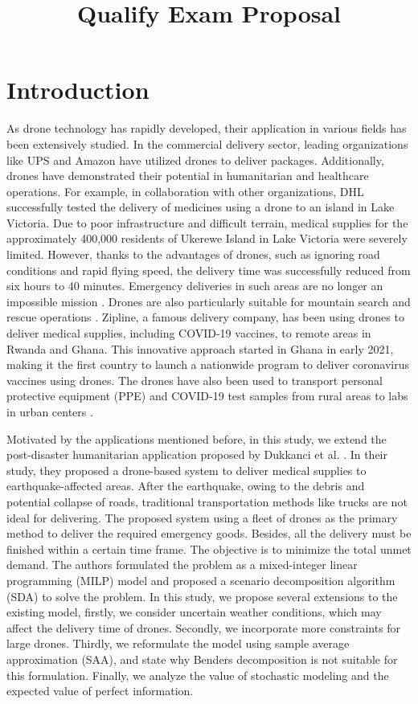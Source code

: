 \documentclass{lxaiproposal}
\title{Qualify Exam Proposal}
\author{\coord{Yuyang}{Ma}{}}
\begin{document}
\maketitle
\section{Introduction} \label{section:intro}
\vspace*{-3mm}

As drone technology has rapidly developed, their application in various fields has been extensively studied. In the commercial delivery sector, leading organizations like UPS \cite{ups2017drone} and Amazon \cite{amazon2022drone} have utilized drones to deliver packages. Additionally, drones have demonstrated their potential in humanitarian and healthcare operations. For example, in collaboration with other organizations, DHL successfully tested the delivery of medicines using a drone to an island in Lake Victoria. Due to poor infrastructure and difficult terrain, medical supplies for the approximately 400,000 residents of Ukerewe Island in Lake Victoria were severely limited. However, thanks to the advantages of drones, such as ignoring road conditions and rapid flying speed, the delivery time was successfully reduced from six hours to 40 minutes. Emergency deliveries in such areas are no longer an impossible mission \cite{dhl2018drone}. Drones are also particularly suitable for mountain search and rescue operations \cite{karaca2018potential}. Zipline, a famous delivery company, has been using drones to deliver medical supplies, including COVID-19 vaccines, to remote areas in Rwanda and Ghana. This innovative approach started in Ghana in early 2021, making it the first country to launch a nationwide program to deliver coronavirus vaccines using drones. The drones have also been used to transport personal protective equipment (PPE) and COVID-19 test samples from rural areas to labs in urban centers \cite{Zipline2020}.

Motivated by the applications mentioned before, in this study, we extend the post-disaster humanitarian application proposed by Dukkanci et al. \cite{dukkanci2023drones}. In their study, they proposed a drone-based system to deliver medical supplies to earthquake-affected areas. After the earthquake, owing to the debris and potential collapse of roads, traditional transportation methods like trucks are not ideal for delivering. The proposed system using a fleet of drones as the primary method to deliver the required emergency goods. Besides, all the delivery must be finished within a certain time frame. The objective is to minimize the total unmet demand. The authors formulated the problem as a mixed-integer linear programming (MILP) model and proposed a scenario decomposition algorithm (SDA) to solve the problem. In this study, we propose several extensions to the existing model, firstly, we consider uncertain weather conditions, which may affect the delivery time of drones. Secondly, we incorporate more constraints for large drones. Thirdly, we reformulate the model using sample average approximation (SAA), and state why Benders decomposition is not suitable for this formulation. Finally, we analyze the value of stochastic modeling and the expected value of perfect information.
\end{document}
